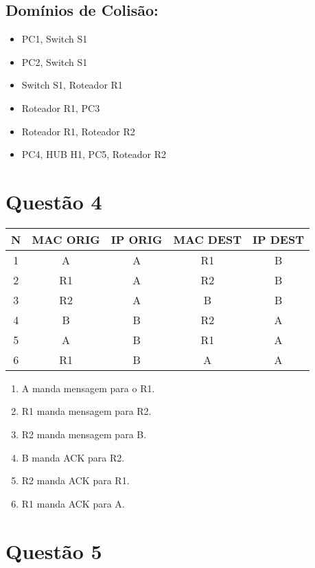 \documentclass{article}
\begin{document}
\subsection*{Domínios de Colisão:}
\begin{itemize}
    \item PC1, Switch S1
    \item PC2, Switch S1
    \item Switch S1, Roteador R1
    \item Roteador R1, PC3
    \item Roteador R1, Roteador R2
    \item PC4, HUB H1, PC5, Roteador R2
\end{itemize}

\section*{Questão 4}

\begin{tabular}{|c|c|c|c|c|}
    \hline
    N & MAC ORIG & IP ORIG & MAC DEST & IP DEST \\
    \hline
    1 & A         & A        & R1        & B        \\
    2 & R1        & A        & R2        & B        \\
    3 & R2        & A        & B         & B        \\
    4 & B         & B        & R2        & A        \\
    5 & A         & B        & R1        & A        \\
    6 & R1        & B        & A         & A        \\
    \hline
\end{tabular}

\begin{enumerate}
    \item A manda mensagem para o R1.
    \item R1 manda mensagem para R2.
    \item R2 manda mensagem para B.
    \item B manda ACK para R2.
    \item R2 manda ACK para R1.
    \item R1 manda ACK para A.
\end{enumerate}

\newpage
\section*{Questão 5}
\end{document}
